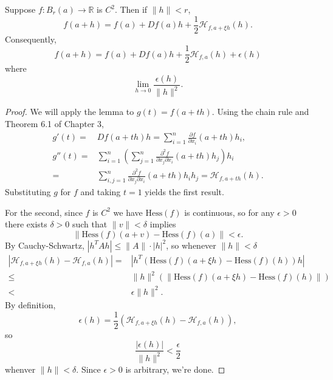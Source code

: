 \documentclass[12pt]{article}
\begin{document}
\begin{proposition}
	Suppose $f:B_r(a)\to\mathbb{R}$ is $C^2$. Then if $\|h\|<r$,
	\begin{equation*}
		f(a+h)=f(a)+Df(a)h+\frac{1}{2}\mathcal{H}_{f,a+\xi h}(h).
	\end{equation*}
	Consequently,
	\begin{equation*}
		f(a+h) = f(a)+Df(a)h+\frac{1}{2}\mathcal{H}_{f,a}(h) + \epsilon(h)
	\end{equation*}
	where
	\begin{equation*}
		\lim_{h\to 0}\frac{\epsilon(h)}{\|h\|^2}.
	\end{equation*}
\end{proposition}
\begin{proof}
	We will apply the lemma to $g(t)=f(a+th)$. Using the chain rule and Theorem 6.1 of Chapter 3, 
	\begin{align*}
		g'(t) =& Df(a+th)h = \sum_{i=1}^n \frac{\partial f}{\partial x_i}(a+th)h_i, \\
		g''(t) =& \sum_{i=1}^n \left( \sum_{j=1}^n \frac{\partial^2 f}{\partial x_j\partial x_i}(a+th)h_j\right)h_i \\
		=& \sum_{i,j=1}^n \frac{\partial^2 f}{\partial x_j\partial x_i}(a+th)h_ih_j = \mathcal{H}_{f,a+th}(h).
	\end{align*}
	Substituting $g$ for $f$ and taking $t=1$ yields the first result.

	For the second, since $f$ is $C^2$ we have $\text{Hess}(f)$ is continuous, so for any $\epsilon>0$ there exists $\delta>0$ such that $\|v\|<\delta$ implies 
	\begin{equation*}
		\|\text{Hess}(f)(a+v)-\text{Hess}(f)(a)\|<\epsilon.
	\end{equation*}
	By Cauchy-Schwartz, $|h^TAh|\leq \|A\|\cdot |h|^2$, so whenever $\|h\|<\delta$ 
	\begin{align*}
		|\mathcal{H}_{f,a+\xi h}(h)-\mathcal{H}_{f,a}(h)|
		=& |h^T(\text{Hess}(f)(a+\xi h)-\text{Hess}(f)(h))h| \\
		\leq& \|h\|^2 (\|\text{Hess}(f)(a+\xi h)-\text{Hess}(f)(h)\|) \\
		<& \epsilon \|h\|^2.
	\end{align*}
	By definition, 
	\begin{equation*}
		\epsilon(h) = \frac{1}{2}(\mathcal{H}_{f,a+\xi h}(h)-\mathcal{H}_{f,a}(h)),
	\end{equation*}
	so 
	\begin{equation*}
		\frac{|\epsilon(h)|}{\|h\|^2} < \frac{\epsilon}{2}
	\end{equation*}
	whenver $\|h\|<\delta$. Since $\epsilon>0$ is arbitrary, we're done.
\end{proof}
\end{document}

